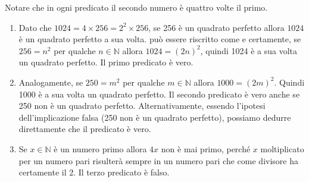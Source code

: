 \begin{soluzione}
Notare che in ogni predicato il secondo numero è quattro volte il primo. 

\begin{enumerate}
    \item Dato che $1024 = 4 \times 256 = 2^2 \times 256$, se 256 è un quadrato perfetto allora $1024$ è un quadrato perfetto a sua volta.  può essere riscritto come  e certamente, se $256=n^2$ per qualche $n \in \mathbb{N}$ allora $1024 = (2n)^2$, quindi 1024 è a sua volta un quadrato perfetto. Il primo predicato è vero. 
    
    \item Analogamente, se $250 = m^2$ per qualche $m \in \mathbb{N}$ allora $1000 = (2m)^2$. Quindi 1000 è a sua volta un quadrato perfetto. Il secondo predicato è vero anche se 250 non è un quadrato perfetto.\newline
    Alternativamente, essendo l'ipotesi dell'implicazione falsa (250 non è un quadrato perfetto), possiamo dedurre direttamente che il predicato è vero.
    
    \item Se $x \in \mathbb{N}$ è un numero primo allora $4x$ non è mai primo, perché $x$ moltiplicato per un numero pari risulterà sempre in un numero pari che come divisore ha certamente il 2. Il terzo predicato è falso. 
\end{enumerate}
\end{soluzione}
